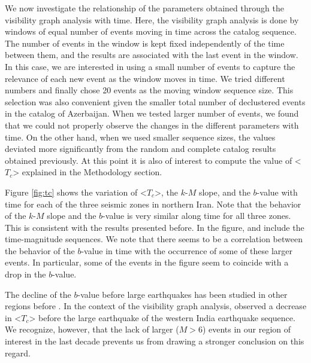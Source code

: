 We now investigate the relationship of the parameters obtained through the visibility graph analysis with time. Here, the visibility graph analysis is done by windows of equal number of events moving in time across the catalog sequence. The number of events in the window is kept fixed independently of the time between them, and the results are associated with the last event in the window. In this case, we are interested in using a small number of events to capture the relevance of each new event as the window moves in time. We tried different numbers and finally chose 20 events as the moving window sequence size. This selection was also convenient given the smaller total number of declustered events in the catalog of Azerbaijan. When we tested larger number of events, we found that we could not properly observe the changes in the different parameters with time. On the other hand, when we used smaller sequence sizes, the values deviated more significantly from the random and complete catalog results obtained previously. At this point it is also of interest to compute the value of <$T_c$> explained in the Methodology section.

Figure \ref{fig:tc} shows the variation of <$T_c$>, the $k$-$M$ slope, and the $b$-value with time for each of the three seismic zones in northern Iran. Note that the behavior of the $k$-$M$ slope and the $b$-value is very similar along time for all three zones. This is consistent with the results presented before. In the figure, and include the time-magnitude sequences. We note that there seems to be a correlation between the behavior of the $b$-value in time with the occurrence of some of these larger events. In particular, some of the events in the figure seem to coincide with a drop in the $b$-value. 

The decline of the $b$-value before large earthquakes has been studied in other regions before \citep[e.g.,][]{Wyss2000, Wyss2006, Schorlemmer2005, Chan2012}. In the context of the visibility graph analysis, \citet{Telesca2016} observed a decrease in <$T_c$> before the large earthquake of the western India earthquake sequence. We recognize, however, that the lack of larger ($M>6$) events in our region of interest in the last decade prevents us from drawing a stronger conclusion on this regard. 
